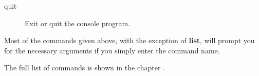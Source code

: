 \begin{description}


\item [quit]
   Exit or quit the console program.
\end{description}

Most of the commands given above, with the exception of {\bf list}, will
prompt you for the necessary arguments if you simply enter the command name.

The full list of commands is shown in the chapter .
